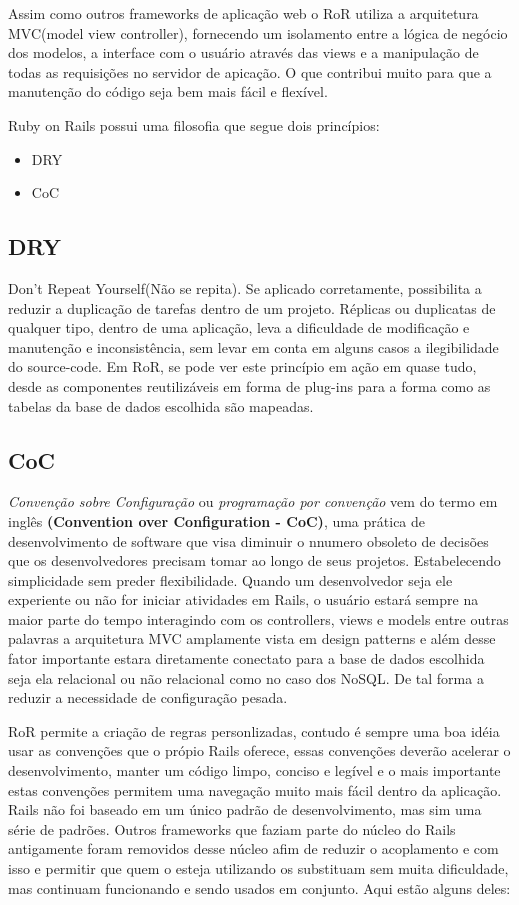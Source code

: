 Assim como outros frameworks de aplicação web o RoR utiliza a arquitetura  MVC(model view controller), fornecendo um isolamento entre a lógica de negócio 
dos modelos, a interface com o usuário através das views e a manipulação de todas as requisições no servidor de apicação. O que contribui muito para que a manutenção do código seja bem mais fácil e flexível.

Ruby on Rails possui uma filosofia que segue dois princípios:
\begin{itemize}
 \item {DRY}
 \item {CoC}
\end{itemize}

\subsection{DRY}
Don't Repeat Yourself(Não se repita). Se aplicado corretamente, possibilita a reduzir a duplicação de tarefas dentro de um projeto. Réplicas ou duplicatas de qualquer
tipo, dentro de uma aplicação, leva a dificuldade de modificação e manutenção e inconsistência, sem levar em conta em alguns casos a ilegibilidade do source-code. 
Em RoR, se pode ver este princípio em ação em quase tudo, desde as componentes reutilizáveis em forma de plug-ins para a forma como as tabelas da base de dados escolhida são mapeadas.

\subsection{CoC}

\textit{Convenção sobre Configuração} ou \textit{programação por convenção} vem do termo em inglês \textbf{(Convention over Configuration - CoC)}, uma prática de desenvolvimento de software que visa diminuir o nnumero obsoleto de decisões que os desenvolvedores precisam tomar ao longo de seus projetos. Estabelecendo simplicidade sem preder flexibilidade.
Quando um desenvolvedor seja ele experiente ou não for iniciar atividades em Rails, o usuário estará sempre na maior parte do tempo interagindo com os controllers, views e models entre outras palavras a arquitetura MVC amplamente vista em design patterns e além desse fator importante estara diretamente conectato para a base de dados escolhida seja ela 
relacional ou não relacional como no caso dos NoSQL. De tal forma a reduzir a necessidade de configuração pesada.

RoR permite a criação de regras personlizadas, contudo é sempre  uma boa idéia usar as convenções que o própio	Rails oferece, essas convenções deverão acelerar o desenvolvimento, manter um código limpo, conciso e legível e o mais importante estas convenções permitem uma navegação muito mais fácil dentro da aplicação.
Rails não foi baseado  em um único padrão de desenvolvimento, mas sim uma série de padrões. Outros frameworks que faziam parte do núcleo do Rails antigamente foram removidos desse núcleo afim de reduzir o acoplamento e com isso e permitir que quem o esteja utilizando os substituam sem  muita dificuldade, mas continuam funcionando e sendo usados em conjunto. Aqui estão alguns deles:

